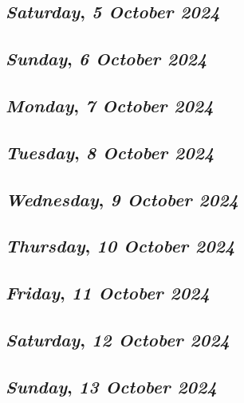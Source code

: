 \def\day{\textit{5 October 2024}}
\def\weekday{\textit{Saturday}}
\subsection*{\weekday, \day}

\def\day{\textit{6 October 2024}}
\def\weekday{\textit{Sunday}}
\subsection*{\weekday, \day}

\def\day{\textit{7 October 2024}}
\def\weekday{\textit{Monday}}
\subsection*{\weekday, \day}

\def\day{\textit{8 October 2024}}
\def\weekday{\textit{Tuesday}}
\subsection*{\weekday, \day}

\def\day{\textit{9 October 2024}}
\def\weekday{\textit{Wednesday}}
\subsection*{\weekday, \day}

\def\day{\textit{10 October 2024}}
\def\weekday{\textit{Thursday}}
\subsection*{\weekday, \day}

\def\day{\textit{11 October 2024}}
\def\weekday{\textit{Friday}}
\subsection*{\weekday, \day}

\def\day{\textit{12 October 2024}}
\def\weekday{\textit{Saturday}}
\subsection*{\weekday, \day}

\def\day{\textit{13 October 2024}}
\def\weekday{\textit{Sunday}}
\subsection*{\weekday, \day}

